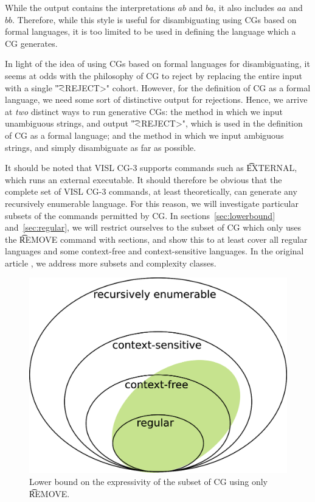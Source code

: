 While the output contains the interpretations $ab$ and $ba$, it also includes
$aa$ and $bb$. Therefore, while this style is useful for disambiguating using
CGs based on formal languages, it is too limited to be used in defining the
language which a CG generates.

In light of the idea of using CGs based on formal languages for disambiguating,
it seems at odds with the philosophy of CG to reject by replacing the entire
input with a single \t{"<REJECT>"} cohort. 
However, for the definition of CG as a formal language, we need some sort of
distinctive output for rejections. Hence, we arrive at \emph{two} distinct ways
to run generative CGs: the method in which we input unambiguous strings, and
output \t{"<REJECT>"}, which is used in the definition of CG as a formal
language; and the method in which we input ambiguous strings, and simply
disambiguate as far as possible. 


It should be noted that VISL CG-3 \cite{bick2015,vislcg3} supports
commands such as \t{EXTERNAL}, which runs an external executable. It
should therefore be obvious that the complete set of VISL CG-3
commands, at least theoretically, can generate any recursively
enumerable language. For this reason, we will investigate particular
subsets of the commands permitted by CG.  In
sections~\ref{sec:lowerbound} and~\ref{sec:regular}, we will restrict
ourselves to the subset of CG which only uses the \t{REMOVE} command
with sections, and show this to at least cover all regular languages
and some context-free and context-sensitive languages.  In the
original article \cite{kokke2017expressivity}, we address more subsets
and complexity classes.

\begin{figure}[h]
  \centering
  \includegraphics[width=0.4\linewidth]{chapters/chomsky}
  \caption{Lower bound on the expressivity of the subset of CG using only \t{REMOVE}.}
  \label{fig:nocorr}
\end{figure}


